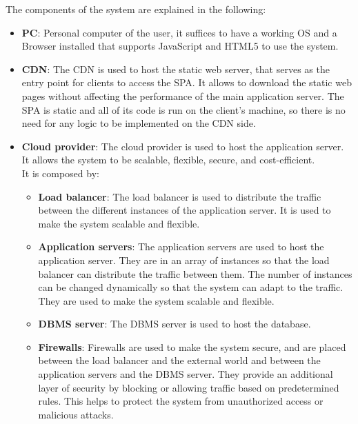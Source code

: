 The components of the system are explained in the following:
\begin{itemize}
    \item \textbf{PC}: Personal computer of the user, it suffices to have a working OS and a Browser installed that supports JavaScript and HTML5 to use the system.
    \item \textbf{CDN}: The CDN is used to host the static web server, that serves as the entry point for clients to access the SPA.
          It allows to download the static web pages without affecting the performance of the main application server.
          The SPA is static and all of its code is run on the client's machine, so there is no need for any logic to be implemented on the CDN side.
    \item \textbf{Cloud provider}: The cloud provider is used to host the application server.
          It allows the system to be scalable, flexible, secure, and cost-efficient.\\
          It is composed by:
          \begin{itemize}
              \item \textbf{Load balancer}: The load balancer is used to distribute the traffic between the different instances of the application server.
                    It is used to make the system scalable and flexible.
              \item \textbf{Application servers}: The application servers are used to host the application server.
                    They are in an array of instances so that the load balancer can distribute the traffic between them.
                    The number of instances can be changed dynamically so that the system can adapt to the traffic.
                    They are used to make the system scalable and flexible.
              \item \textbf{DBMS server}: The DBMS server is used to host the database.
              \item \textbf{Firewalls}: Firewalls are used to make the system secure, and are placed between the load balancer and the external world and between the application servers and the DBMS server.
                    They provide an additional layer of security by blocking or allowing traffic based on predetermined rules.
                    This helps to protect the system from unauthorized access or malicious attacks.
          \end{itemize}
\end{itemize}

